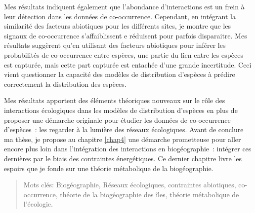 Mes résultats indiquent également que l'abondance d'interactions est un
frein à leur détection dans les données de co-occurrence. Cependant, en
intégrant la similarité des facteurs abiotiques pour les différents
sites, je montre que les signaux de co-occurrence s'affaiblissent e
réduisent pour parfois disparaitre. Mes résultats suggèrent qu'en
utilisant des facteurs abiotiques pour inférer les probabilités de
co-occurrence entre espèces, une partie du lien entre les espèces est
capturée, mais cette part capturée est entachée d'une grande
incertitude. Ceci vient questionner la capacité des modèles de
distribution d'espèces à prédire correctement la distribution des
espèces.

Mes résultats apportent des éléments théoriques nouveaux sur le rôle des
interactions écologiques dans les modèles de distribution d'espèces en
plus de proposer une démarche originale pour étudier les données de
co-occurrence d'espèces~: les regarder à la lumière des réseaux
écologiques. Avant de conclure ma thèse, je propose au chapitre
\ref{chap4} une démarche prometteuse pour aller encore plus loin dans
l'intégration des interactions en biogéographie~: intégrer ces dernières
par le biais des contraintes énergétiques. Ce dernier chapitre livre les
espoirs que je fonde sur une théorie métabolique de la biogéographie.

\begin{quote}
Mots clés: Biogéographie, Réseaux écologiques, contraintes abiotiques,
co-occurrence, théorie de la biogéographie des îles, théorie métabolique
de l'écologie.
\end{quote}
